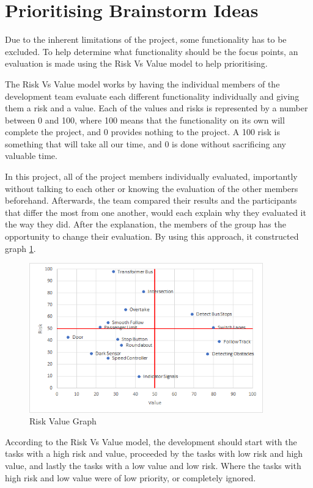 \section{Prioritising Brainstorm Ideas}

Due to the inherent limitations of the project, some functionality has to be excluded. To help determine what functionality should be the focus points, an evaluation is made using the Risk Vs Value model to help prioritising.

The Risk Vs Value model works by having the individual members of the development team evaluate each different functionality individually and giving them a risk and a value. Each of the values and risks is represented by a number between 0 and 100, where 100 means that the functionality on its own will complete the project, and 0 provides nothing to the project. A 100 risk is something that will take all our time, and 0 is done without sacrificing any valuable time. 

In this project, all of the project members individually evaluated, importantly without talking to each other or knowing the evaluation of the other members beforehand. Afterwards, the team compared their results and the participants that differ the most from one another, would each explain why they evaluated it the way they did. After the explanation, the members of the group has the opportunity to change their evaluation. By using this approach, it constructed graph \ref{fig:RiskValueGraph}.

\begin{figure}[!h]
    \centering
	\includegraphics[width=0.9\textwidth]{Images/Graphs/RiskValue.png}
    \caption{Risk Value Graph}
    \label{fig:RiskValueGraph}
\end{figure}

According to the Risk Vs Value model, the development should start with the tasks with a high risk and value, proceeded by the tasks with low risk and high value, and lastly the tasks with a low value and low risk. Where the tasks with high risk and low value were of low priority, or completely ignored. 

